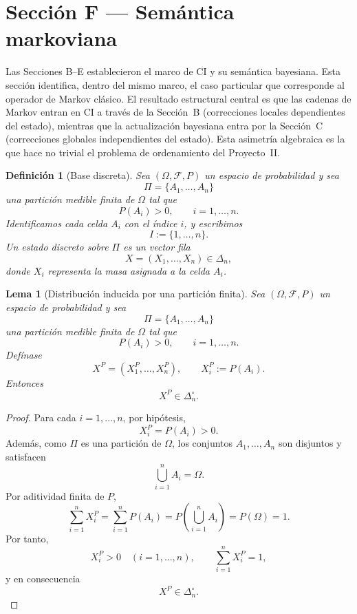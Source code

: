 ﻿\documentclass[12pt]{article}
\newtheorem{definicion}{Definición}[section]
\newtheorem{lema}{Lema}[section]
\begin{document}
\section{Sección F --- Semántica markoviana}

Las Secciones B--E establecieron el marco de CI y su semántica bayesiana. Esta sección identifica, dentro del mismo marco, el caso particular que corresponde al operador de Markov clásico. El resultado estructural central es que las cadenas de Markov entran en CI a través de la Sección~B (correcciones locales dependientes del estado), mientras que la actualización bayesiana entra por la Sección~C (correcciones globales independientes del estado). Esta asimetría algebraica es la que hace no trivial el problema de ordenamiento del Proyecto~II.

\begin{definicion}[Base discreta]\label{def:base_discreta_markov}
Sea $(\Omega,\mathcal F,P)$ un espacio de probabilidad y sea
\[
\Pi=\{A_1,\dots,A_n\}
\]
una partición medible finita de $\Omega$ tal que
\[
P(A_i)>0,\qquad i=1,\dots,n.
\]
Identificamos cada celda $A_i$ con el índice $i$, y escribimos
\[
I:=\{1,\dots,n\}.
\]
Un estado discreto sobre $\Pi$ es un vector fila
\[
X=(X_1,\dots,X_n)\in\Delta_n,
\]
donde $X_i$ representa la masa asignada a la celda $A_i$.
\end{definicion}

\begin{lema}[Distribución inducida por una partición finita]\label{lem:distribucion_inducida_particion}
Sea $(\Omega,\mathcal F,P)$ un espacio de probabilidad y sea
\[
\Pi=\{A_1,\dots,A_n\}
\]
una partición medible finita de $\Omega$ tal que
\[
P(A_i)>0,\qquad i=1,\dots,n.
\]
Defínase
\[
X^P=(X^P_1,\dots,X^P_n),
\qquad
X^P_i:=P(A_i).
\]
Entonces
\[
X^P\in\Delta_n^\circ.
\]
\end{lema}

\begin{proof}
Para cada $i=1,\dots,n$, por hipótesis,
\[
X^P_i=P(A_i)>0.
\]
Además, como $\Pi$ es una partición de $\Omega$, los conjuntos $A_1,\dots,A_n$ son disjuntos y satisfacen
\[
\bigcup_{i=1}^n A_i=\Omega.
\]
Por aditividad finita de $P$,
\[
\sum_{i=1}^n X^P_i
=
\sum_{i=1}^n P(A_i)
=
P\!\left(\bigcup_{i=1}^n A_i\right)
=
P(\Omega)
=
1.
\]
Por tanto,
\[
X^P_i>0\quad (i=1,\dots,n),
\qquad
\sum_{i=1}^n X^P_i=1,
\]
y en consecuencia
\[
X^P\in\Delta_n^\circ.
\]
\end{proof}
\end{document}
